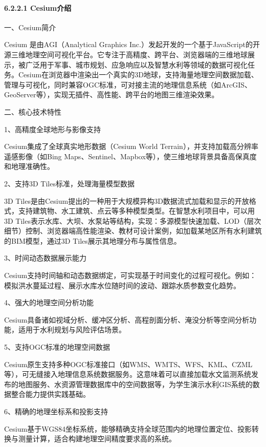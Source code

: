 \hypertarget{cesiumux4ecbux7ecd}{%
\paragraph{6.2.2.1 Cesium介绍}\label{cesiumux4ecbux7ecd}}

一、Cesium简介

Cesium 是由AGI（Analytical Graphics Inc.）发起开发的一个基于JavaScript的开源三维地理空间可视化平台。它专注于高精度、跨平台、浏览器端的三维地球展示，被广泛用于军事、城市规划、应急响应以及智慧水利等领域的数据可视化任务。Cesium在浏览器中渲染出一个真实的3D地球，支持海量地理空间数据加载、管理与可视化，同时兼容OGC标准，可对接主流的地理信息系统（如ArcGIS、GeoServer等），实现无插件、高性能、跨平台的地图三维渲染效果。

二、核心技术特性

1、高精度全球地形与影像支持

Cesium集成了全球真实地形数据（Cesium World Terrain），并支持加载高分辨率遥感影像（如Bing Maps、Sentinel、Mapbox等），使三维地球背景具备高保真度和地理准确性。

2、支持3D Tiles标准，处理海量模型数据

3D Tiles是由Cesium提出的一种用于大规模异构3D数据流式加载和显示的开放格式，支持建筑物、水工建筑、点云等多种模型类型。在智慧水利项目中，可以用3D Tiles表示水库、大坝、水泵站等结构，实现：多源模型快速加载、LOD（层次细节）控制、浏览器端高性能渲染、教材可设计案例，如加载某地区所有水利建筑的BIM模型，通过3D Tiles展示其地理分布与属性信息。

3、时间动态数据展示能力

Cesium支持时间轴和动态数据绑定，可实现基于时间变化的过程可视化。例如：模拟洪水蔓延过程、展示水库水位随时间的波动、跟踪水质参数变化趋势。

4、强大的地理空间分析功能

Cesium具备诸如视域分析、缓冲区分析、高程剖面分析、淹没分析等空间分析功能，适用于水利规划与风险评估场景。

5、支持OGC标准的地理空间数据

Cesium原生支持多种OGC标准接口（如WMS、WMTS、WFS、KML、CZML等），可无缝接入地理信息系统数据服务。这意味着可以直接加载水文监测系统发布的地图服务、水资源管理数据库中的空间数据等，为学生演示水利GIS系统的数据整合能力提供实践基础。

6、精确的地理坐标系和投影支持

Cesium基于WGS84坐标系统，能够精确支持全球范围内的地理位置定位、投影转换与测量计算，适合构建地理空间精度要求高的系统。

